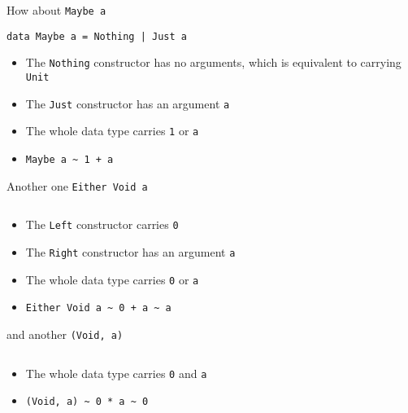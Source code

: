 \begin{frame}[fragile]
\begin{block}{How about \lstinline{Maybe a}}
\begin{lstlisting}
data Maybe a = Nothing | Just a
\end{lstlisting}
\begin{itemize}
  \item<1-> The \lstinline{Nothing} constructor has no arguments, which is equivalent to carrying \lstinline{Unit}
  \item<1-> The \lstinline{Just} constructor has an argument \lstinline{a}
  \item<2-> The whole data type carries \lstinline{1} or \lstinline{a}
  \item<2-> \lstinline{Maybe a ~ 1 + a}
\end{itemize}
\end{block}
\end{frame}

\begin{frame}[fragile]
\begin{block}{Another one \lstinline{Either Void a}}
\begin{lstlisting}
\end{lstlisting}
\begin{itemize}
  \item<1-> The \lstinline{Left} constructor carries \lstinline{0}
  \item<1-> The \lstinline{Right} constructor has an argument \lstinline{a}
  \item<2-> The whole data type carries \lstinline{0} or \lstinline{a}
  \item<2-> \lstinline{Either Void a ~ 0 + a ~ a}
\end{itemize}
\end{block}
\end{frame}

\begin{frame}[fragile]
\begin{block}{and another \lstinline{(Void, a)}}
\begin{lstlisting}
\end{lstlisting}
\begin{itemize}
  \item<1-> The whole data type carries \lstinline{0} and \lstinline{a}
  \item<2-> \lstinline{(Void, a) ~ 0 * a ~ 0}
\end{itemize}
\end{block}
\end{frame}

